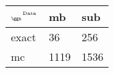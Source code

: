 \begin{tabular}{lll}
    \toprule
    $_{\text{\tiny{\ggn}}}$$^{\text{\tiny{Data}}}$ & mb & sub \\
    \midrule
    exact & 36
              & 256 \\
    mc   & 1119
              & 1536 \\
    \bottomrule
\end{tabular}